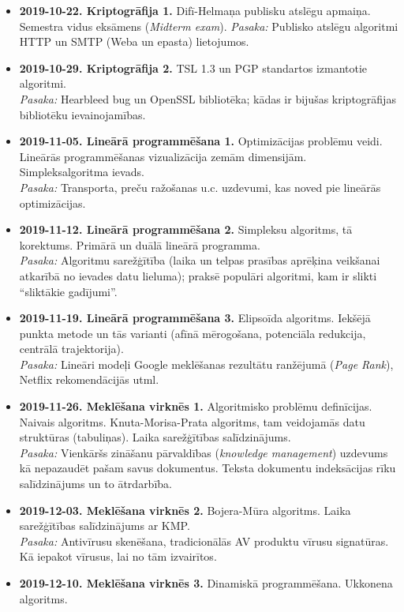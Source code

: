 \documentclass[11pt]{article}
\begin{document}
\begin{itemize}
\item {\bf 2019-10-22. Kriptogrāfija \textendash{} 1.} 
Difī-Helmaņa publisku atslēgu apmaiņa. Semestra vidus eksāmens ({\em Midterm exam}).
{\em Pasaka:} Publisko atslēgu algoritmi HTTP un SMTP (Weba un epasta) lietojumos.
\item {\bf 2019-10-29. Kriptogrāfija \textendash{} 2.} TSL 1.3 un PGP standartos izmantotie algoritmi.\\
{\em Pasaka:} Hearbleed bug un OpenSSL bibliotēka; kādas ir bijušas kriptogrāfijas bibliotēku ievainojamības.
\item {\bf 2019-11-05. Lineārā programmēšana \textendash{} 1.} Optimizācijas problēmu veidi. 
Lineārās programmēšanas vizualizācija zemām dimensijām. Simpleksalgoritma ievads.\\
{\em Pasaka:} 
Transporta, preču ražošanas u.c. uzdevumi, kas noved pie lineārās optimizācijas.
\item {\bf 2019-11-12. Lineārā programmēšana \textendash{} 2.} Simpleksu algoritms, tā korektums. 
Primārā un duālā lineārā programma.\\
{\em Pasaka:} Algoritmu sarežģītība (laika un telpas prasības aprēķina veikšanai atkarībā 
no ievades datu lieluma); praksē populāri algoritmi, kam ir slikti “sliktākie gadījumi”.
\item {\bf 2019-11-19. Lineārā programmēšana \textendash{} 3.} Elipsoīda algoritms. Iekšējā punkta metode un tās varianti 
(afīnā mērogošana, potenciāla redukcija, centrālā trajektorija).\\
{\em Pasaka:} Lineāri modeļi Google meklēšanas rezultātu ranžējumā ({\em Page Rank}), 
Netflix rekomendācijās utml.
\item {\bf 2019-11-26. Meklēšana virknēs \textendash{} 1.} 
Algoritmisko problēmu definīcijas. Naivais algoritms. Knuta-Morisa-Prata algoritms, 
tam veidojamās datu struktūras (tabuliņas). Laika sarežģītības salīdzinājums.\\
{\em Pasaka:} Vienkāršs zināšanu pārvaldības ({\em knowledge management}) uzdevums \textendash{} 
kā nepazaudēt pašam savus dokumentus. Teksta dokumentu indeksācijas rīku salīdzinājums un to ātrdarbība.
\item {\bf 2019-12-03. Meklēšana virknēs \textendash{} 2.} 
Bojera-Mūra algoritms. Laika sarežģītības salīdzinājums ar KMP.\\
{\em Pasaka:} Antivīrusu skenēšana, tradicionālās AV produktu vīrusu signatūras. 
Kā iepakot vīrusus, lai no tām izvairītos.
\item {\bf 2019-12-10. Meklēšana virknēs \textendash{} 3.} Dinamiskā programmēšana. Ukkonena algoritms. 

\end{itemize}
\end{document}

